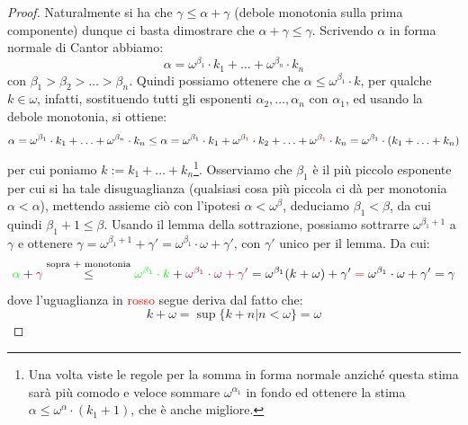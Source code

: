\begin{proof}
	Naturalmente si ha che $\gamma \leq \alpha + \gamma$ (debole monotonia sulla prima componente) dunque ci basta dimostrare che $\alpha + \gamma \leq \gamma$.
	Scrivendo $\alpha$ in forma normale di Cantor abbiamo:
	\[ \alpha = \omega^{\beta_1} \cdot k_1 + \ldots + \omega^{\beta_n} \cdot k_n
		\]
	con $\beta_1 > \beta_2 > \ldots > \beta_n$. Quindi possiamo ottenere che $\alpha \leq \omega^{\beta_1} \cdot k$, per qualche $k \in \omega$, infatti, sostituendo tutti gli esponenti $\alpha_2,\ldots,\alpha_n$ con $\alpha_1$, ed usando la debole monotonia, si ottiene:
	\[ \alpha = \omega^{\beta_1} \cdot k_1 + \ldots + \omega^{\beta_n} \cdot k_n \leq \alpha = \omega^{\beta_1} \cdot k_1 + \omega^{\beta_{\textcolor{red}{1}}} \cdot k_2 + \ldots + \omega^{\beta_{\textcolor{red}{1}}} \cdot k_n = \omega^{\beta_1}\cdot (k_1 + \ldots + k_n)
		\]
	per cui poniamo $k := k_1 + \ldots + k_n$\footnote{Una volta viste le regole per la somma in forma normale anziché questa stima sarà più comodo e veloce sommare $\omega^{\alpha_1}$ in fondo ed ottenere la stima $\alpha \leq \omega^{\alpha} \cdot (k_1 + 1)$, che è anche migliore.}.
	Osserviamo che $\beta_1$ è il più piccolo esponente per cui si ha tale disuguaglianza (qualsiasi cosa più piccola ci dà per monotonia $\alpha < \alpha$), mettendo assieme ciò con l'ipotesi $\alpha < \omega^\beta$, deduciamo $\beta_1 < \beta$, da cui
	quindi $\beta_1 + 1 \leq \beta$. Usando il lemma della sottrazione, possiamo sottrarre $\omega^{\beta_1 + 1}$ a $\gamma$ e ottenere $\gamma = \omega^{\beta_1 + 1} + \gamma' = \omega^{\beta_1} \cdot \omega + \gamma'$, con $\gamma'$ unico per il lemma.
	Da cui:
	\[ \textcolor{green}{\alpha} + \textcolor{purple}{\gamma} \overset{\text{sopra + monotonia}}{\leq} \textcolor{green}{\omega^{\beta_1} \cdot k} + \textcolor{purple}{\omega^{\beta_1} \cdot \omega + \gamma'} = \omega^{\beta_1} (k + \omega) + \gamma' \;\textcolor{red}{=}\; \omega^{\beta_1} \cdot \omega + \gamma' = \gamma
		\]
	dove l'uguaglianza in \textcolor{red}{rosso} segue deriva dal fatto che:
	\[ k + \omega = \sup\{k + n | n < \omega\} = \omega
		\]
\end{proof}

